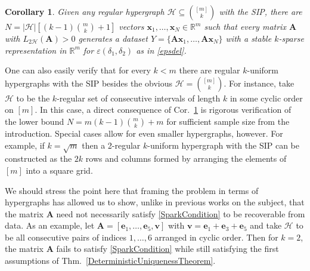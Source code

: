 \documentclass[journal, twocolumn]{IEEEtran}
\newtheorem{corollary}{Corollary}
\begin{document}
\begin{corollary}\label{DeterministicUniquenessCorollary}
Given any regular hypergraph $\mathcal{H} \subseteq {[m] \choose k}$ with the SIP, there are $N =  |\mathcal{H}| \left[ (k-1){m \choose k} + 1  \right]$ vectors \mbox{$\mathbf{x}_1, \ldots, \mathbf{x}_N \in \mathbb{R}^m$} such that every matrix $\mathbf{A}$ with $L_{2\mathcal{H}}(\mathbf{A}) > 0$ generates a dataset $Y = \{\mathbf{A}\mathbf{x}_1, \ldots, \mathbf{A}\mathbf{x}_N\}$ with a stable $k$-sparse representation in $\mathbb{R}^m$ for $\varepsilon(\delta_1,\delta_2)$ as in \eqref{epsdel}.
\end{corollary}


One can also easily verify that for every $k < m$ there are regular $k$-uniform hypergraphs with the SIP besides the obvious $\mathcal{H} = {[m] \choose k}$. For instance, take $\mathcal{H}$ to be the $k$-regular set of consecutive intervals of length $k$ in some cyclic order on $[m]$. In this case, a direct consequence of Cor.~\ref{DeterministicUniquenessCorollary} is rigorous verification of the lower bound \mbox{$N = m(k-1){m \choose k} + m$} for sufficient sample size from the introduction. Special cases allow for even smaller hypergraphs, however. For example, if $k = \sqrt{m}$ then a 2-regular $k$-uniform hypergraph with the SIP can be constructed as the $2k$ rows and columns formed by arranging the elements of $[m]$ into a square grid.

We should stress the point here that framing the problem in terms of hypergraphs has allowed us to show, unlike in previous works on the subject, that the matrix $\mathbf{A}$ need not necessarily satisfy \eqref{SparkCondition} to be recoverable from data. As an example, let $\mathbf{A} = [ \mathbf{e}_1, \ldots, \mathbf{e}_5, \mathbf{v}]$ with $\mathbf{v} = \mathbf{e}_1 + \mathbf{e}_3 + \mathbf{e}_5$ and take $\mathcal{H}$ to be all consecutive pairs of indices $1, \ldots ,6$ arranged in cyclic order. Then for $k=2$, the matrix $\mathbf{A}$ fails to satisfy \eqref{SparkCondition} while still satisfying the first assumptions of Thm.~\ref{DeterministicUniquenessTheorem}.%
\end{document}
